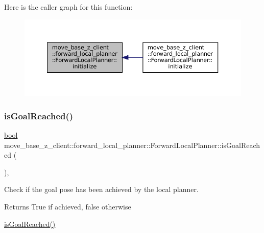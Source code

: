 Here is the caller graph for this function\+:
\nopagebreak
\begin{figure}[H]
\begin{center}
\leavevmode
\includegraphics[width=350pt]{classmove__base__z__client_1_1forward__local__planner_1_1ForwardLocalPlanner_a22add5a4eadd578341cabd55f2cd5c64_icgraph}
\end{center}
\end{figure}
\mbox{\label{classmove__base__z__client_1_1forward__local__planner_1_1ForwardLocalPlanner_a9d46d3b7dc05bbb0f1a0c7f996b5b557}} 
\subsubsection{\texorpdfstring{is\+Goal\+Reached()}{isGoalReached()}}
{\footnotesize\ttfamily \hyperlink{classbool}{bool} move\+\_\+base\+\_\+z\+\_\+client\+::forward\+\_\+local\+\_\+planner\+::\+Forward\+Local\+Planner\+::is\+Goal\+Reached (\begin{DoxyParamCaption}{ }\end{DoxyParamCaption})\hspace{0.3cm}{\ttfamily [override]}, {\ttfamily [virtual]}}



Check if the goal pose has been achieved by the local planner. 

\begin{DoxyReturn}{Returns}
True if achieved, false otherwise
\end{DoxyReturn}
\hyperlink{classmove__base__z__client_1_1forward__local__planner_1_1ForwardLocalPlanner_a9d46d3b7dc05bbb0f1a0c7f996b5b557}{is\+Goal\+Reached()} 

